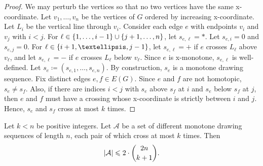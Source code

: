 \documentclass[a4paper,11pt]{article}
\renewcommand{\leq}{\leqslant}
\DeclarePairedDelimiter{\abs}{\lvert}{\rvert} %
\DeclarePairedDelimiter{\set}{\lbrace}{\rbrace} %
\renewcommand{\AA}{\mathcal{A}}
\begin{document}
\begin{proof}
We may perturb the vertices so that no two vertices have the same x-coordinate. Let $v_1, \dotsc, v_n$ be the vertices of $G$ ordered by increasing x-coordinate. Let $L_i$ be the vertical line through $v_i$. Consider each edge $e$ with endpoints $v_i$ and $v_j$ with $i < j$. For $\ell \in \set{1,\dotsc,i - 1} \cup \set{j + 1,\dotsc, n}$, let $s_{e, \ell}= *$. Let $s_{e, i} = 0$ and $s_{e, j} = 0$. 
For  $\ell \in \set{i + 1, \dots,j - 1}$, let $s_{e, \ell} = +$ if $e$ crosses $L_\ell$ above $v_\ell$, and let $s_{e,\ell}= -$ if $e$ crosses $L_\ell$ below $v_\ell$. Since $e$ is x-monotone, $s_{e, \ell}$ is well-defined. Let $s_e \coloneqq (s_{e, 1}, \dotsc, s_{e, n})$. By construction, $s_e$ is a monotone drawing sequence. Fix distinct edges $e, f \in E(G)$. Since $e$ and $f$ are not homotopic, $s_e \neq s_f$. Also, if there are indices $i < j$ with $s_e$ above $s_f$ at $i$ and $s_e$ below $s_f$ at $j$, then $e$ and $f$ must have a crossing whose x-coordinate is strictly between $i$ and $j$. Hence, $s_e$ and $s_f$ cross at most $k$ times.
\end{proof}

\begin{lemma}\label{sequencebound}
    Let $k < n$ be positive integers. Let $\AA$ be a set of different monotone drawing sequences of length $n$, each pair of which cross at most $k$ times. Then
    \begin{equation*}
        \abs{\AA} \leq 2 \cdot \binom{2n}{k + 1}.
    \end{equation*}
\end{lemma}
\end{document}
